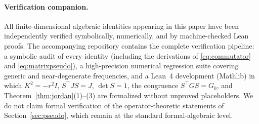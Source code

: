 \documentclass[11pt]{article}
\theoremstyle{definition}
\theoremstyle{remark}
\begin{document}
\paragraph{Verification companion.}
All finite-dimensional algebraic identities appearing in this paper have been
independently verified symbolically, numerically, and by machine-checked
Lean proofs.  The accompanying repository contains the complete verification
pipeline: a symbolic audit of every identity (including the derivations of
\eqref{eq:commutator} and \eqref{eq:matrixpseudo}), a high-precision
numerical regression suite covering generic and near-degenerate frequencies,
and a Lean~4 development (Mathlib) in which $K^2=-r^2I$, $S^{\top}JS=J$,
$\det S=1$, the congruence $S^{\top}GS=G_0$, and
Theorem~\ref{thm:jordan}(1)--(3) are formalized without unproved
placeholders.  We do not claim formal verification of the operator-theoretic
statements of Section~\ref{sec:pseudo}, which remain at the standard
formal-algebraic level.
\end{document}
